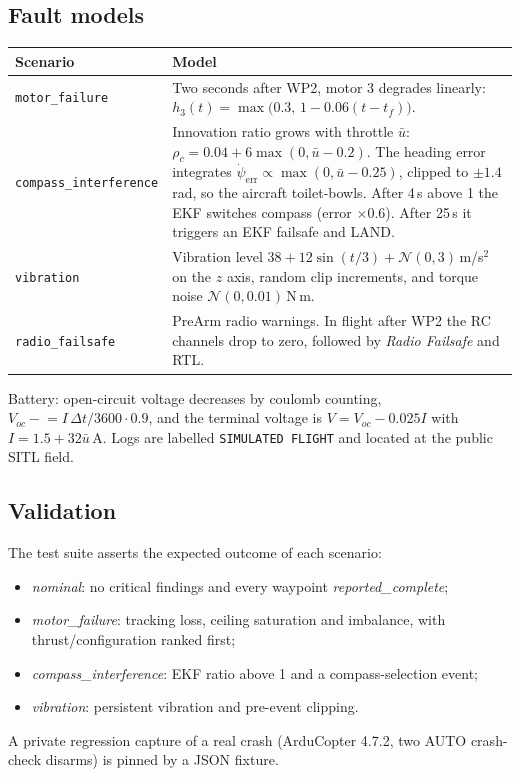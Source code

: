 \documentclass[11pt,a4paper]{article}
\newcommand{\code}[1]{\texttt{#1}}
\begin{document}
\subsection{Fault models}
\begin{tabularx}{\linewidth}{@{}lX@{}}
\toprule
Scenario & Model \\
\midrule
\code{motor\_failure} & Two seconds after WP2, motor 3 degrades linearly:
$h_3(t)=\max\bigl(0.3,\,1-0.06(t-t_f)\bigr)$. \\
\code{compass\_interference} & Innovation ratio grows with throttle $\bar u$:
$\rho_c=0.04+6\max(0,\bar u-0.2)$. The heading error integrates
$\dot\psi_{\text{err}}\propto\max(0,\bar u-0.25)$, clipped to $\pm1.4$\,rad, so the aircraft
toilet-bowls. After 4\,s above 1 the EKF switches compass (error $\times0.6$). After 25\,s it
triggers an EKF failsafe and LAND. \\
\code{vibration} & Vibration level $38+12\sin(t/3)+\mathcal N(0,3)$\,m/s$^2$ on the $z$ axis,
random clip increments, and torque noise $\mathcal N(0,0.01)$\,N\,m. \\
\code{radio\_failsafe} & PreArm radio warnings. In flight after WP2 the RC channels drop to zero,
followed by \emph{Radio Failsafe} and RTL. \\
\bottomrule
\end{tabularx}

\noindent Battery: open-circuit voltage decreases by coulomb counting,
$V_{oc}\mathrel{-}=I\,\Delta t/3600\cdot0.9$, and the terminal voltage is $V=V_{oc}-0.025I$ with
$I=1.5+32\bar u$\,A. Logs are labelled \code{SIMULATED FLIGHT} and located at the public SITL field.

\subsection{Validation}
The test suite asserts the expected outcome of each scenario:
\begin{itemize}
  \item \emph{nominal}: no critical findings and every waypoint \emph{reported\_complete};
  \item \emph{motor\_failure}: tracking loss, ceiling saturation and imbalance, with
        thrust/configuration ranked first;
  \item \emph{compass\_interference}: EKF ratio above 1 and a compass-selection event;
  \item \emph{vibration}: persistent vibration and pre-event clipping.
\end{itemize}
A private regression capture of a real crash (ArduCopter 4.7.2, two AUTO crash-check disarms) is
pinned by a JSON fixture.
\end{document}
